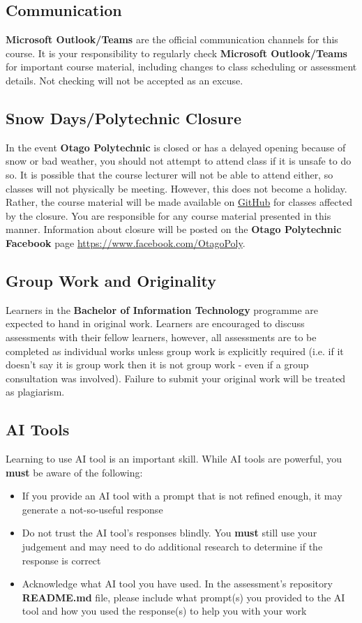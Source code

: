 \documentclass{article}
\begin{document}
\subsection*{Communication}
\textbf{Microsoft Outlook/Teams} are the official communication channels for this course. It is your responsibility to regularly check \textbf{Microsoft Outlook/Teams} for important course material, including changes to class scheduling or assessment details. Not checking will not be accepted as an excuse.

\subsection*{Snow Days/Polytechnic Closure}
In the event \textbf{Otago Polytechnic} is closed or has a delayed opening because of snow or bad weather, you should not attempt to attend class if it is unsafe to do so. It is possible that the course lecturer will not be able to attend either, so classes will not physically be meeting. However, this does not become a holiday. Rather, the course material will be made available on \href{https://github.com/otago-polytechnic-bit-courses/ID737001-game-development}{GitHub} for classes affected by the closure. You are responsible for any course material presented in this manner. Information about closure will be posted on the \textbf{Otago Polytechnic Facebook} page \href{https://www.facebook.com/OtagoPoly}{https://www.facebook.com/OtagoPoly}.

\subsection*{Group Work and Originality}
Learners in the \textbf{Bachelor of Information Technology} programme are expected to hand in original work. Learners are encouraged to discuss assessments with their fellow learners, however, all assessments are to be completed as individual works unless group work is explicitly required (i.e. if it doesn't say it is group work then it is not group work - even if a group consultation was involved). Failure to submit your original work will be treated as plagiarism.

\subsection*{AI Tools}
Learning to use AI tool is an important skill. While AI tools are powerful, you \textbf{must} be aware of the following:

\begin{itemize}
    \item If you provide an AI tool with a prompt that is not refined enough, it may generate a not-so-useful response
    \item Do not trust the AI tool's responses blindly. You \textbf{must} still use your judgement and may need to do additional research to determine if the response is correct
    \item Acknowledge what AI tool you have used. In the assessment's repository \textbf{README.md} file, please include what prompt(s) you provided to the AI tool and how you used the response(s) to help you with your work
\end{itemize}
\end{document}
